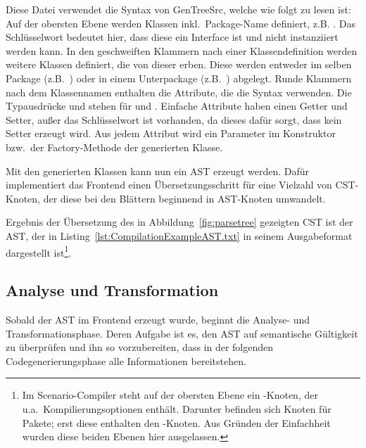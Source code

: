 Diese Datei verwendet die Syntax von GenTreeSrc, welche wie folgt zu lesen ist:
Auf der obersten Ebene werden Klassen inkl.\ Package-Name definiert, z.B. . %
Das Schlüsselwort  bedeutet hier, dass diese ein Interface ist und nicht instanziiert werden kann.
In den geschweiften Klammern nach einer Klassendefinition werden weitere Klassen definiert, die von dieser erben.
Diese werden entweder im selben Package (z.B.\ ) oder in einem Unterpackage (z.B.\ ) abgelegt.
Runde Klammern nach dem Klassennamen enthalten die Attribute, die die Syntax  verwenden.
Die Typausdrücke \code{[T]} und \code{[T:U]} stehen für  und .
Einfache Attribute haben einen Getter und Setter, außer das Schlüsselwort  ist vorhanden, da dieses dafür sorgt, dass kein Setter erzeugt wird.
Aus jedem Attribut wird ein Parameter im Konstruktor bzw.\ der Factory-Methode der generierten Klasse.

Mit den generierten Klassen kann nun ein AST erzeugt werden.
Dafür implementiert das Frontend einen Übersetzungsschritt für eine Vielzahl von CST-Knoten,
der diese bei den Blättern beginnend in AST-Knoten umwandelt.

Ergebnis der Übersetzung des in Abbildung~\ref{fig:parsetree} gezeigten CST ist der AST,
der in Listing~\ref{lst:CompilationExampleAST.txt} in seinem Ausgabeformat dargestellt ist\footnote{
    Im Scenario-Compiler steht auf der obersten Ebene ein -Knoten, der u.a.\ Kompilierungsoptionen enthält.
    Darunter befinden sich Knoten für Pakete;
    erst diese enthalten den -Knoten.
    Aus Gründen der Einfachheit wurden diese beiden Ebenen hier ausgelassen.
}.


\subsection{Analyse und Transformation}\label{subsec:data-model-gentreesrc}

Sobald der AST im Frontend erzeugt wurde, beginnt die Analyse- und Transformationsphase.
Deren Aufgabe ist es, den AST auf semantische Gültigkeit zu überprüfen und ihn so vorzubereiten,
dass in der folgenden Codegenerierungsphase alle Informationen bereitstehen.

